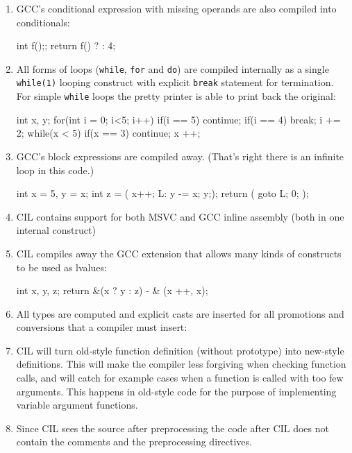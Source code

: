 \documentclass[letterpaper]{article}
\def\t#1{{\tt #1}}
\begin{document}
\begin{enumerate}
\item GCC's conditional expression with missing operands are also compiled
into conditionals:
\begin{cilcode}[local]
  int f();;
  return f() ? : 4;
\end{cilcode}

\item All forms of loops (\t{while}, \t{for} and \t{do}) are compiled
internally as a single \t{while(1)} looping construct with explicit \t{break}
statement for termination. For simple \t{while} loops the pretty printer is
able to print back the original:
\begin{cilcode}[local]
   int x, y;
   for(int i = 0; i<5; i++) {
      if(i == 5) continue;
      if(i == 4) break;
      i += 2;
   } 
   while(x < 5) {
     if(x == 3) continue;
     x ++;
   }
\end{cilcode}

\item GCC's block expressions are compiled away. (That's right there is an
infinite loop in this code.)

\begin{cilcode}[local]
   int x = 5, y = x;
   int z = ({ x++; L: y -= x; y;});
   return ({ goto L; 0; });
\end{cilcode}

\item CIL contains support for both MSVC and GCC inline assembly (both in one
internal construct)

\item CIL compiles away the GCC extension that allows many kinds of constructs
to be used as lvalues:

\begin{cilcode}[local]
   int x, y, z;
   return &(x ? y : z) - & (x ++, x);
\end{cilcode}

\item All types are computed and explicit casts are inserted for all
promotions and conversions that a compiler must insert:

\item CIL will turn old-style function definition (without prototype) into
new-style definitions. This will make the compiler less forgiving when
checking function calls, and will catch for example cases when a function is
called with too few arguments. This happens in old-style code for the purpose
of implementing variable argument functions.
 
\item Since CIL sees the source after preprocessing the code after CIL does
not contain the comments and the preprocessing directives.


\end{enumerate}
\end{document}
